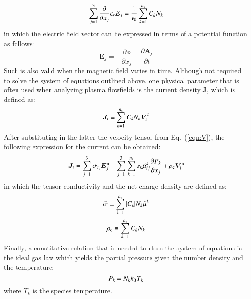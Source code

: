 \documentclass{warpdoc}
\newcommand{\mfd}{\displaystyle}
\newcommand{\ns}{{n_{\rm s}}}
\renewcommand{\vec}[1]{\bm{#1}}
\begin{document}
%
\begin{equation}
\sum_{j=1}^3 \frac{\partial }{\partial x_j} \epsilon_r \vec{E}_j=\frac{1}{\epsilon_0} \sum_{k=1}^\ns C_k N_k 
\label{eqn:gauss}
\end{equation}
%
in which the electric field vector can be expressed in terms of a potential function as follows:  
%
\begin{equation}
  \vec{E}_j=-\frac{\partial \phi}{\partial x_j} - \frac{\partial \vec{A}_j}{\partial t}
  \label{eqn:potential}
\end{equation}
%
Such is also valid when the magnetic field varies in time.  
Although not required to solve the system of equations outlined above, one physical parameter that is often used when analyzing plasma flowfields is the current density $\vec{J}$, which is defined as:
%
\begin{equation}
  \vec{J}_i \equiv \sum_{k=1}^\ns C_k N_k  \vec{V}^k_i
 \label{eqn:Jdefinition}
\end{equation}
%
After substituting in the latter the velocity tensor from Eq.\ (\ref{eqn:V}), the following expression for the current can be obtained:
%
\begin{equation}
\begin{array}{l}
\mfd  \vec{J}_i = \sum_{j=1}^3  \wtilde{\sigma}_{ij} \vec{E}_j^{\rm n} 
             - \sum_{j=1}^3 \sum_{k=1}^\ns s_k \wtilde{\mu}^k_{ij}  \frac{\partial P_k}{\partial x_j}
+ \rho_{\rm c} \vec{V}_i^{\rm n} 
\end{array}
\label{eqn:J}
\end{equation}
%
in which the tensor conductivity and the net charge density are defined as:
%
\begin{equation}
\begin{array}{l}
\mfd
\wtilde{\sigma}\equiv\sum_{k=1}^\ns |C_k| N_k \wtilde{\mu}^k
\end{array}
\label{eqn:sigmatilde}
\end{equation}
%
%
\begin{equation}
\rho_{\rm c}\equiv\sum_{k=1}^\ns C_k N_k
\label{eqn:rhoe}
\end{equation}
%
Finally, a constitutive relation that is needed to close the system of equations is the ideal gas law which yields the partial pressure given the number density and the temperature:
%
\begin{equation}
P_k = N_k k_{\rm B} T_k
\label{eqn:Pk}
\end{equation}
%
where $T_k$ is the species temperature.
\end{document}
